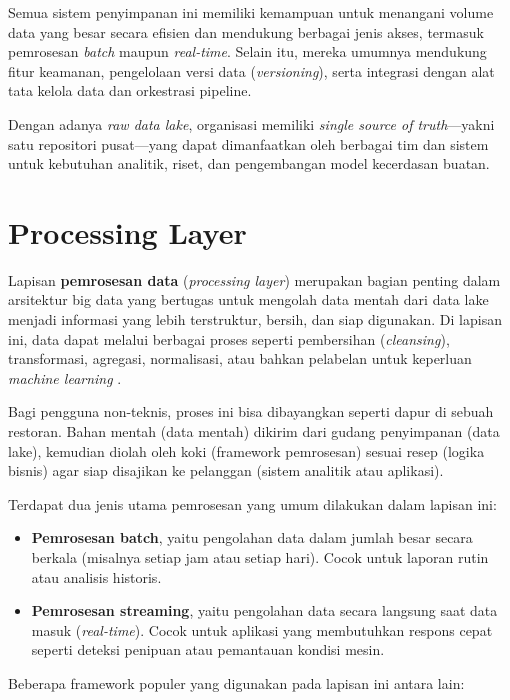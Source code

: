 Semua sistem penyimpanan ini memiliki kemampuan untuk menangani volume data yang besar secara efisien dan mendukung berbagai jenis akses, termasuk pemrosesan \textit{batch} maupun \textit{real-time}. Selain itu, mereka umumnya mendukung fitur keamanan, pengelolaan versi data (\textit{versioning}), serta integrasi dengan alat tata kelola data dan orkestrasi pipeline.

Dengan adanya \textit{raw data lake}, organisasi memiliki \textit{single source of truth}—yakni satu repositori pusat—yang dapat dimanfaatkan oleh berbagai tim dan sistem untuk kebutuhan analitik, riset, dan pengembangan model kecerdasan buatan.


\section{Processing Layer}

Lapisan \textbf{pemrosesan data} (\textit{processing layer}) merupakan bagian penting dalam arsitektur big data yang bertugas untuk mengolah data mentah dari data lake menjadi informasi yang lebih terstruktur, bersih, dan siap digunakan. Di lapisan ini, data dapat melalui berbagai proses seperti pembersihan (\textit{cleansing}), transformasi, agregasi, normalisasi, atau bahkan pelabelan untuk keperluan \textit{machine learning} \cite{armbrust2020datasystems}.

Bagi pengguna non-teknis, proses ini bisa dibayangkan seperti dapur di sebuah restoran. Bahan mentah (data mentah) dikirim dari gudang penyimpanan (data lake), kemudian diolah oleh koki (framework pemrosesan) sesuai resep (logika bisnis) agar siap disajikan ke pelanggan (sistem analitik atau aplikasi).

Terdapat dua jenis utama pemrosesan yang umum dilakukan dalam lapisan ini:

\begin{itemize}
	\item \textbf{Pemrosesan batch}, yaitu pengolahan data dalam jumlah besar secara berkala (misalnya setiap jam atau setiap hari). Cocok untuk laporan rutin atau analisis historis.
	
	\item \textbf{Pemrosesan streaming}, yaitu pengolahan data secara langsung saat data masuk (\textit{real-time}). Cocok untuk aplikasi yang membutuhkan respons cepat seperti deteksi penipuan atau pemantauan kondisi mesin.
\end{itemize}

Beberapa framework populer yang digunakan pada lapisan ini antara lain:

